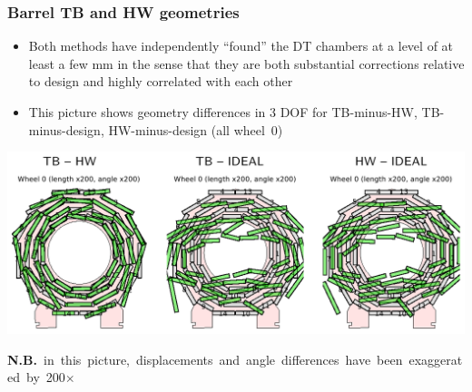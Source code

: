\documentclass[compress]{beamer}
\begin{document}
\begin{frame}
\frametitle{Barrel TB and HW geometries}

\begin{itemize}
\item Both methods have independently ``found'' the DT chambers at a
  level of at least a few mm in the sense that they are both
  substantial corrections relative to design and highly correlated with each other
\item This picture shows geometry differences in 3 DOF for TB-minus-HW, TB-minus-design, HW-minus-design (all wheel~0)
\end{itemize}

\vfill
\includegraphics[width=\linewidth]{tb-hw_wheel0.png}

\mbox{\scriptsize {\bf N.B.} in this picture, displacements and angle differences have been exaggerated by 200$\times$\hspace{-1 cm}}
\end{frame}
\end{document}
